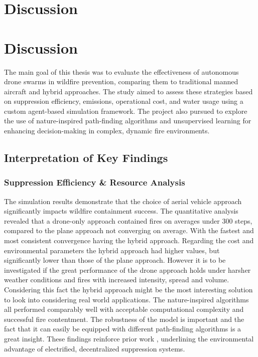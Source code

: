 \documentclass[11pt, a4paper]{article}
\begin{document}
\section{Discussion}

\section{Discussion}
\label{sec:discussion}

The main goal of this thesis was to evaluate the effectiveness of autonomous drone swarms in wildfire prevention, comparing them to traditional manned aircraft and hybrid approaches. The study aimed to assess these strategies based on suppression efficiency, emissions, operational cost, and water usage using a custom agent-based simulation framework. The project also pursued to explore the use of nature-inspired path-finding algorithms and unsupervised learning for enhancing decision-making in complex, dynamic fire environments.

\subsection{Interpretation of Key Findings}

\subsubsection{Suppression Efficiency \& Resource Analysis}

The simulation results demonstrate that the choice of aerial vehicle approach significantly impacts wildfire containment success. The quantitative analysis revealed that a drone-only approach contained fires on averages under 300 steps, compared to the plane approach not converging on average. With the fastest and most consistent convergence having the hybrid approach. 
Regarding the cost and environmental parameters the hybrid approach had higher values, but significantly lower than those of the plane approach. However it is to be investigated if the great performance of the drone approach holds under harsher weather conditions and fires with increased intensity, spread and volume. Considering this fact the hybrid approach might be the most interesting solution to look into considering real world applications. The nature-inspired algorithms all performed comparably well with acceptable computational complexity and successful fire contentment. The robustness of the model is important and the fact that it can easily be equipped with different path-finding algorithms is a great insight. These findings reinforce prior work \cite{Saffre2022} \cite{stolaroffEnergyUseLife2018}, underlining the environmental advantage of electrified, decentralized suppression systems. 
\end{document}
